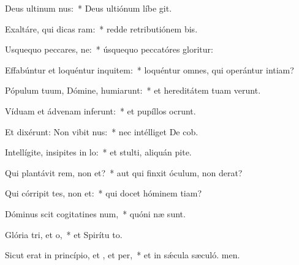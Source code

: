 \item Deus ultinum nus:~* Deus ultiónum líbe git.
\item Exaltáre, qui dicas ram:~* redde retributiónem bis.
\item Usquequo peccares, ne:~* úsquequo peccatóres gloritur:
\item Effabúntur et loquéntur inquitem:~* loquéntur omnes, qui operántur intiam?
\item Pópulum tuum, Dómine, humiarunt:~* et hereditátem tuam verunt.
\item Víduam et ádvenam inferunt:~* et pupíllos ocrunt.
\item Et dixérunt: Non vibit nus:~* nec intélliget De cob.
\item Intellígite, insipites in lo:~* et stulti, aliquán pite.
\item Qui plantávit rem, non et?~* aut qui finxit óculum, non derat?
\item Qui córripit tes, non et:~* qui docet hóminem tiam?
\item Dóminus scit cogitatines num,~* quóni næ sunt.
\item Glória tri, et o,~* et Spirítu to.
\item Sicut erat in princípio, et , et per,~* et in sǽcula sæculó. men.
